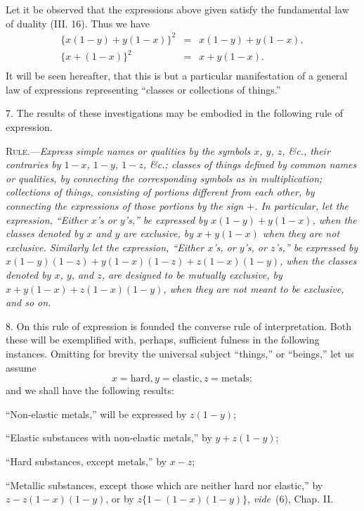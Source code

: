 \documentclass[oneside]{book}
\begin{document}
Let it be observed that the expressions above given satisfy
the fundamental law of duality (III. 16). Thus we have
\begin{eqnarray*}
\{x (1 - y) + y (1 - x)\}^2 &=& x (1 -y) + y (1 - x),\\
\{x + (1-x)\}^2 &=& x+y(1-x).\\
\end{eqnarray*}
It will be seen hereafter, that this is but a particular manifestation
of a general law of expressions representing ``classes or
collections of things.''

7. The results of these investigations may be embodied in
the following rule of expression.

\textsc{Rule}.---\textit{Express simple names or qualities by the symbols $x$, $y$, $z$,
\&c., their contraries by $1 - x$, $1 - y$, $1 - z$, \&c.; classes of things
defined by common names or qualities, by connecting the corresponding
symbols as in multiplication; collections of things, consisting of
portions different from each other, by connecting the expressions of
those portions by the sign $+$. In particular, let the expression, ``Either
$x$'s or $y$'s,'' be expressed by $x (1 - y) + y (1 - x)$, when the classes denoted
by $x$ and $y$ are exclusive, by $x + y (1 - x)$ when they are not
exclusive. Similarly let the expression, ``Either $x$'s, or $y$'s, or $z$'s,'' be
expressed by $x(1-y)(1-z) + y(1-x)(1-z) + z(1-x)(1-y)$,
when the classes denoted by $x$, $y$, and $z$, are designed to be mutually
exclusive, by $x + y (1 - x) + z (1 - x) (1-y)$, when they are not meant
to be exclusive, and so on.}

8. On this rule of expression is founded the converse rule of
interpretation. Both these will be exemplified with, perhaps,
sufficient fulness in the following instances. Omitting for brevity
the universal subject ``things,'' or ``beings,'' let us assume
\[ x = \textrm{hard}, y = \textrm{elastic}, z = \textrm{metals}; \]
and we shall have the following results:

\begin{center}
``Non-elastic metals,'' will be expressed by $z (1 - y)$;

``Elastic substances with non-elastic metals,'' by $y + z (1 - y)$;

``Hard substances, except metals,'' by $x-z$;

``Metallic substances, except those which are neither hard nor
elastic,'' by $z-z(1 - x)(1 - y)$, or by $z \{1 - (1 - x) (1 - y)\}$,
\textit{vide}~(6), Chap. II.
\end{center}
\end{document}
